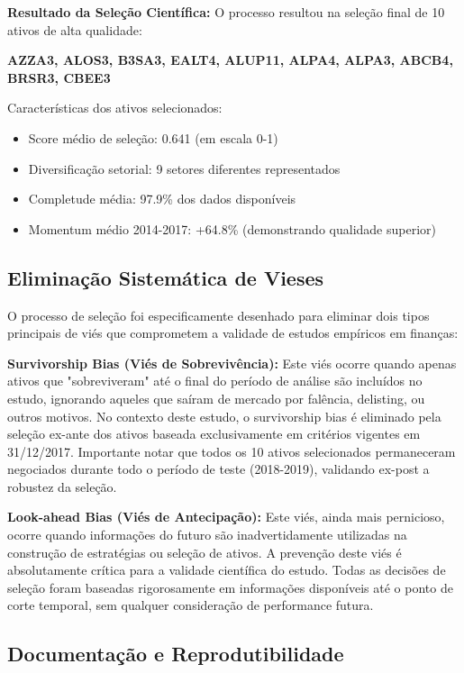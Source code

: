 \textbf{Resultado da Seleção Científica:}
O processo resultou na seleção final de 10 ativos de alta qualidade:
\begin{center}
\textbf{AZZA3, ALOS3, B3SA3, EALT4, ALUP11, ALPA4, ALPA3, ABCB4, BRSR3, CBEE3}
\end{center}

Características dos ativos selecionados:
\begin{itemize}
    \item Score médio de seleção: 0.641 (em escala 0-1)
    \item Diversificação setorial: 9 setores diferentes representados
    \item Completude média: 97.9\% dos dados disponíveis
    \item Momentum médio 2014-2017: +64.8\% (demonstrando qualidade superior)
\end{itemize}

\subsection{Eliminação Sistemática de Vieses}

O processo de seleção foi especificamente desenhado para eliminar dois tipos principais de viés que comprometem a validade de estudos empíricos em finanças:

\textbf{Survivorship Bias (Viés de Sobrevivência):} Este viés ocorre quando apenas ativos que "sobreviveram" até o final do período de análise são incluídos no estudo, ignorando aqueles que saíram de mercado por falência, delisting, ou outros motivos. No contexto deste estudo, o survivorship bias é eliminado pela seleção ex-ante dos ativos baseada exclusivamente em critérios vigentes em 31/12/2017. Importante notar que todos os 10 ativos selecionados permaneceram negociados durante todo o período de teste (2018-2019), validando ex-post a robustez da seleção.

\textbf{Look-ahead Bias (Viés de Antecipação):} Este viés, ainda mais pernicioso, ocorre quando informações do futuro são inadvertidamente utilizadas na construção de estratégias ou seleção de ativos. A prevenção deste viés é absolutamente crítica para a validade científica do estudo. Todas as decisões de seleção foram baseadas rigorosamente em informações disponíveis até o ponto de corte temporal, sem qualquer consideração de performance futura.

\subsection{Documentação e Reprodutibilidade}

